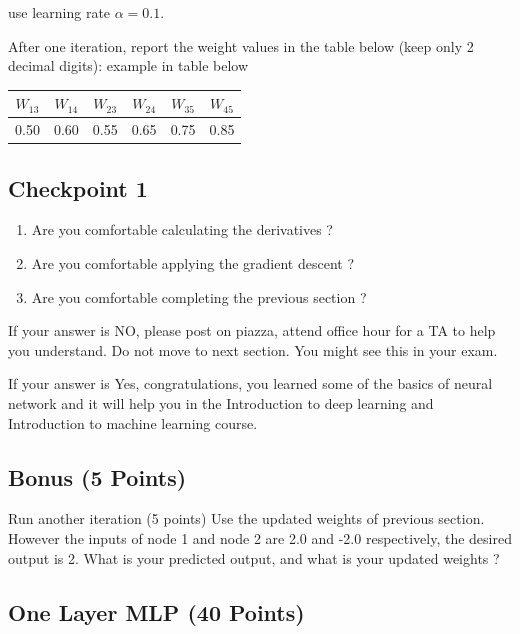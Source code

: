 \documentclass{article}
\begin{document}
\begin{enumerate}
    use learning rate $\alpha = 0.1$. 
    
    After one iteration, report the weight values in the table below (keep only 2 decimal digits): example
in table below
    \begin{center}
        \begin{tabular}{|c|c|c|c|c|c|}
        \hline
        $W_{13}$ & $W_{14}$ & $W_{23}$ & $W_{24}$ & $W_{35}$ & $W_{45}$ \\ \hline
        0.50    & 0.60    & 0.55    & 0.65    & 0.75    & 0.85    \\ \hline
        \end{tabular}
    \end{center}
\end{enumerate}

\subsection{Checkpoint 1}
\begin{enumerate}
    \item  Are you comfortable calculating the derivatives ?
\item Are you comfortable applying the gradient descent ?
\item Are you comfortable completing the previous section ?
\end{enumerate}

If your answer is NO, please post on piazza, attend office hour for a TA to help you understand.
Do not move to next section. You might see this in your exam.


If your answer is Yes, congratulations, you learned some of the basics of neural network and it will help you
in the Introduction to deep learning and Introduction to machine learning course.

\subsection{Bonus (5 Points)}
Run another iteration (5 points) Use the updated weights of previous section. However the inputs of
node 1 and node 2 are 2.0 and -2.0 respectively, the desired output is 2. What is your predicted output, and
what is your updated weights ?

\subsection{One Layer MLP (40 Points)}
\end{document}
